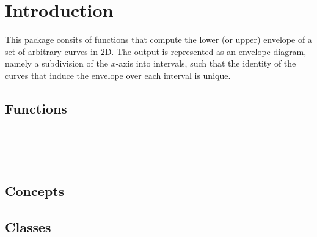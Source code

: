 \clearpage
{}
\label{chapterEnvelope2Ref}


\section*{Introduction}
\label{env2_ref_sec:intro}

This package consits of functions that compute the lower (or upper)
envelope of a set of arbitrary curves in 2D. The output is
represented as an envelope diagram, namely a subdivision of the
$x$-axis into intervals, such that the identity of the curves that
induce the envelope over each interval is unique.

\subsection*{Functions}

\\
\\
\\

\subsection*{Concepts}


\subsection*{Classes}



